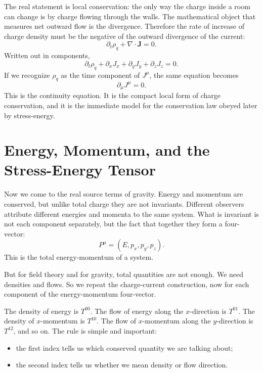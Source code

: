 The real statement is local conservation: the only way the charge inside a room can change is by charge flowing through the walls. The mathematical object that measures net outward flow is the divergence. Therefore the rate of increase of charge density must be the negative of the outward divergence of the current:
\begin{equation}
\partial_t \rho_q + \nabla\cdot \mathbf J = 0.
\end{equation}
Written out in components,
\begin{equation}
\partial_t \rho_q + \partial_x J_x + \partial_y J_y + \partial_z J_z = 0.
\end{equation}
If we recognize \(\rho_q\) as the time component of \(J^\mu\), the same equation becomes
\begin{equation}
\partial_\mu J^\mu = 0.
\end{equation}
This is the continuity equation. It is the compact local form of charge conservation, and it is the immediate model for the conservation law obeyed later by stress-energy.

\section{Energy, Momentum, and the Stress-Energy Tensor}

Now we come to the real source terms of gravity. Energy and momentum are conserved, but unlike total charge they are not invariants. Different observers attribute different energies and momenta to the same system. What is invariant is not each component separately, but the fact that together they form a four-vector:
\begin{equation}
P^\mu=(E,p_x,p_y,p_z).
\end{equation}
This is the total energy-momentum of a system.

But for field theory and for gravity, total quantities are not enough. We need densities and flows. So we repeat the charge-current construction, now for each component of the energy-momentum four-vector.

The density of energy is \(T^{00}\). The flow of energy along the \(x\)-direction is \(T^{01}\). The density of \(x\)-momentum is \(T^{10}\). The flow of \(x\)-momentum along the \(y\)-direction is \(T^{12}\), and so on. The rule is simple and important:
\begin{itemize}
\item the first index tells us which conserved quantity we are talking about;
\item the second index tells us whether we mean density or flow direction.
\end{itemize}


